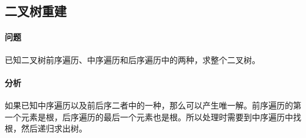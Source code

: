 \subsection{二叉树重建}
	\paragraph{问题} 已知二叉树前序遍历、中序遍历和后序遍历中的两种，求整个二叉树。

	\paragraph{分析} 如果已知中序遍历以及前后序二者中的一种，那么可以产生唯一解。前序遍历的第一个元素是根，后序遍历的最后一个元素也是根。所以处理时需要到中序遍历中找根，然后递归求出树。
	
	